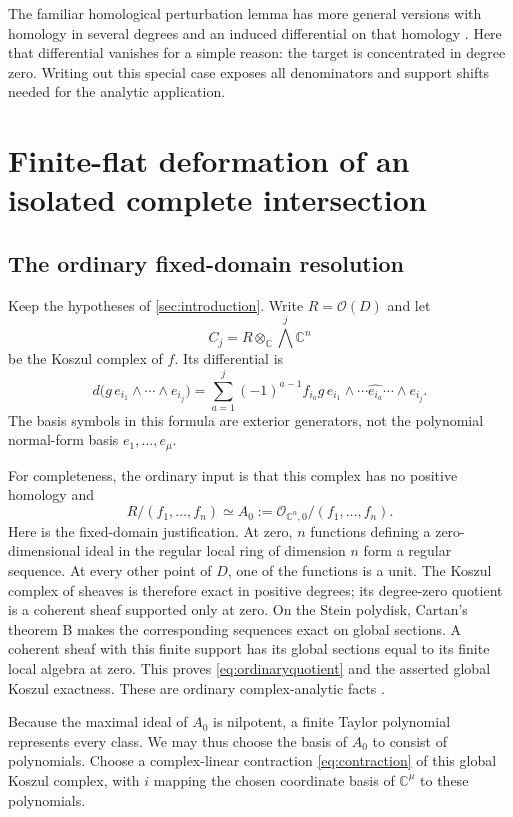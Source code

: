 \documentclass[11pt,letterpaper]{article}
\theoremstyle{definition}
\theoremstyle{remark}
\newcommand{\C}{\mathbb C}
\newcommand{\OO}{\mathcal O}
\begin{document}
The familiar homological perturbation lemma has more general versions with homology in several degrees and an induced differential on that homology \cite{Crainic}. Here that differential vanishes for a simple reason: the target is concentrated in degree zero. Writing out this special case exposes all denominators and support shifts needed for the analytic application.

\section{Finite-flat deformation of an isolated complete intersection}
\label{sec:finitealgebra}

\subsection{The ordinary fixed-domain resolution}
Keep the hypotheses of \cref{sec:introduction}. Write $R=\OO(D)$ and let
\[
 C_j=R\otimes_\C\bigwedge^j\C^n
\]
be the Koszul complex of $f$. Its differential is
\begin{equation}\label{eq:koszul}
 d\bigl(g\,e_{i_1}\wedge\cdots\wedge e_{i_j}\bigr)
 =\sum_{a=1}^{j}(-1)^{a-1}f_{i_a}g\,
       e_{i_1}\wedge\cdots\widehat{e_{i_a}}\cdots\wedge e_{i_j}.
\end{equation}
The basis symbols in this formula are exterior generators, not the polynomial normal-form basis $e_1,\ldots,e_\mu$.

For completeness, the ordinary input is that this complex has no positive homology and
\begin{equation}\label{eq:ordinaryquotient}
 R/(f_1,\ldots,f_n)\simeq A_0
 :=\OO_{\C^n,0}/(f_1,\ldots,f_n).
\end{equation}
Here is the fixed-domain justification. At zero, $n$ functions defining a zero-dimensional ideal in the regular local ring of dimension $n$ form a regular sequence. At every other point of $D$, one of the functions is a unit. The Koszul complex of sheaves is therefore exact in positive degrees; its degree-zero quotient is a coherent sheaf supported only at zero. On the Stein polydisk, Cartan's theorem B makes the corresponding sequences exact on global sections. A coherent sheaf with this finite support has its global sections equal to its finite local algebra at zero. This proves \eqref{eq:ordinaryquotient} and the asserted global Koszul exactness. These are ordinary complex-analytic facts \cite{Cartan,GunningRossi}.

Because the maximal ideal of $A_0$ is nilpotent, a finite Taylor polynomial represents every class. We may thus choose the basis of $A_0$ to consist of polynomials. Choose a complex-linear contraction \eqref{eq:contraction} of this global Koszul complex, with $i$ mapping the chosen coordinate basis of $\C^\mu$ to these polynomials.
\end{document}
